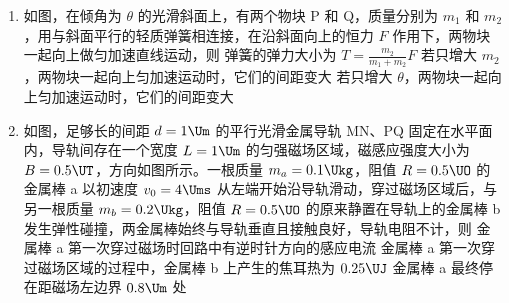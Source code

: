 \documentclass[\gkver]{gaokaozhenti}
\begin{document}
\begin{enumerate}
{B．水平射程为 $x=v_{0}t=10\Ums\times0.5\Us=5\Um$，故 B 正确；

C、D．竖直方向分速度为 $v_{y}=gt=10\Umsq\times0.5\Us=5\Ums$，水平分速度为 $v_{x}=v_{0}=10\Ums$，落地速度为 $v=\sqrt{v_{y}^{2}+v_{x}^{2}}=5\sqrt{5}\Ums$，故 C 错误，D 正确。

故选 BD。
}

\item
如图，在倾角为 $\theta$ 的光滑斜面上，有两个物块 P 和 Q，质量分别为 $m_{1}$ 和 $m_{2}$，用与斜面平行的轻质弹簧相连接，在沿斜面向上的恒力 $F$ 作用下，两物块一起向上做匀加速直线运动，则
{弹簧的弹力大小为 $T=\frac{m_{2}}{m_{1}+m_{2}}F$}
{若只增大 $m_{2}$，两物块一起向上匀加速运动时，它们的间距变大}
{若只增大 $\theta$，两物块一起向上匀加速运动时，它们的间距变大}

\item
如图，足够长的间距 $d=1\Um$ 的平行光滑金属导轨 MN、PQ 固定在水平面内，导轨间存在一个宽度 $L=1\Um$ 的匀强磁场区域，磁感应强度大小为 $B=0.5\UT$，方向如图所示。一根质量 $m_{a}=0.1\Ukg$，阻值 $R=0.5\UO$ 的金属棒 a 以初速度 $v_{0}=4\Ums$ 从左端开始沿导轨滑动，穿过磁场区域后，与另一根质量 $m_{b}=0.2\Ukg$，阻值 $R=0.5\UO$ 的原来静置在导轨上的金属棒 b 发生弹性碰撞，两金属棒始终与导轨垂直且接触良好，导轨电阻不计，则
{金属棒 a 第一次穿过磁场时回路中有逆时针方向的感应电流}
{金属棒 a 第一次穿过磁场区域的过程中，金属棒 b 上产生的焦耳热为 $0.25\UJ$}
{金属棒 a 最终停在距磁场左边界 $0.8\Um$ 处}
\end{enumerate}
\end{document}
